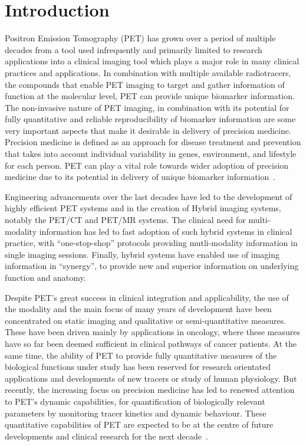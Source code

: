 \chapter{Introduction}
Positron Emission Tomography (PET) has grown over a period of multiple decades from a tool used infrequently and primarily limited to research applications into a clinical imaging tool which plays a major role in many clinical practices and applications. 
In combination with multiple available radiotracers, the compounds that enable PET imaging to target and gather information of function at the molecular level, PET can provide unique biomarker information. The non-invasive nature of PET imaging, in combination with its potential for fully quantitative and reliable reproducibility of biomarker information are some very important aspects that make it desirable in delivery of precision medicine. Precision medicine is defined as an approach for disease treatment and prevention that takes into account individual variability in genes, environment, and lifestyle for each person. PET can play a vital role towards wider adoption of precision medicine due to its potential in delivery of unique biomarker information~\cite{Subramaniam2017}.

Engineering advancements over the last decades have led to the development of highly efficient PET systems and in the creation of Hybrid imaging systems, notably the PET/CT and PET/MR systems. The clinical need for multi-modality information has led to fast adoption of such hybrid systems in clinical practice, with “one-stop-shop” protocols providing mutli-modality information in single imaging sessions. Finally, hybrid systems have enabled use of imaging information in “synergy”, to provide new and superior information on underlying function and anatomy. 

Despite PET’s great success in clinical integration and applicability, the use of the modality and the main focus of many years of development have been concentrated on static imaging and qualitative or semi-quantitative measures. These have been driven mainly by applications in oncology, where these measures have so far been deemed sufficient in clinical pathways of cancer patients. At the same time, the ability of PET to provide fully quantitative measures of the biological functions under study has been reserved for research orientated applications and developments of new tracers or study of human physiology. 
But recently, the increasing focus on precision medicine has led to renewed attention to PET’s dynamic capabilities, for quantification of biologically relevant parameters by monitoring tracer kinetics and dynamic behaviour. These quantitative capabilities of PET are expected to be at the centre of future developments and clinical research for the next decade~\cite{Lammertsma2017,Meikle2021}.

